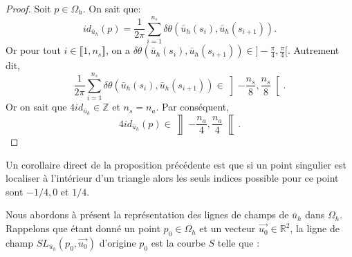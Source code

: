\begin{proof}
Soit $p\in\Omega_h$. On sait que:
$$
id_{\bar{u}_h}(p)=\displaystyle\frac{1}{2\pi}\sum_{i=1}^{n_s}\delta\theta(\bar{u}_h(s_i),\bar{u}_h(s_{i+1})).
$$
Or pour tout $i\in\llbracket 1, n_s\rrbracket$, on a $\delta\theta(\bar{u}_h(s_i),\bar{u}_h(s_{i+1}))\in]-\frac{\pi}{4}, \frac{\pi}{4}[$. Autrement dit,
$$
\displaystyle\frac{1}{2\pi}\sum_{i=1}^{n_s}\delta\theta(\bar{u}_h(s_i),\bar{u}_h(s_{i+1}))\in\left]-\frac{n_s}{8}, \frac{n_s}{8}\right[.
$$
Or on sait que $4id_{\bar{u}_h}\in\mathbb{Z}$ et $n_s=n_a$. Par conséquent,
$$
4id_{\bar{u}_h}(p)\in\left\rrbracket-\frac{n_a}{4}, \frac{n_a}{4}\right\llbracket.
$$
\end{proof}
Un corollaire direct de la proposition précédente est que si un point singulier est localiser à l'intérieur d'un triangle alors les seuls indices possible pour ce point sont $-1/4, 0$ et $1/4$.

Nous abordons à présent la représentation des lignes de champs de $\bar{u}_h$ dans $\Omega_h$. Rappelons que étant donné un point $p_0\in\Omega_h$ et un vecteur $\overrightarrow{u_0}\in\mathbb{R}^2$, la ligne de champ $SL_{\bar{u}_h}(p_0, \overrightarrow{u_0})$ d'origine $p_0$ est la courbe $S$ telle que :

